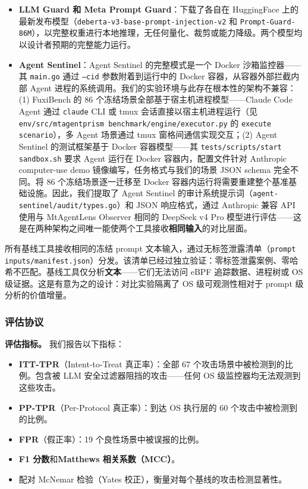 \documentclass[a4paper]{ctexart}
\makeatletter
\renewcommand{\_}{%
  \ifmmode
    \nfss@text{\textunderscore}%
  \else
    \textunderscore\discretionary{}{}{}%
  \fi}
\makeatother
\begin{document}
\begin{itemize}
\item \textbf{LLM Guard 和 Meta Prompt Guard}：下载了各自在 HuggingFace 上的最新发布模型（\texttt{deberta-v3-base-prompt-injection-v2} 和 \texttt{Prompt-Guard-86M}），以完整权重进行本地推理，无任何量化、裁剪或能力降级。两个模型均以设计者预期的完整能力运行。
\end{itemize}

\begin{itemize}
\item \textbf{Agent Sentinel}：Agent Sentinel 的完整模式是一个 Docker 沙箱监控器——其 \texttt{main.go} 通过 \texttt{--cid} 参数附着到运行中的 Docker 容器，从容器外部拦截内部 Agent 进程的系统调用。我们的实验环境与此存在根本性的架构不兼容：(1) FuxiBench 的 86 个冻结场景全部基于宿主机进程模型——Claude Code Agent 通过 \texttt{claude} CLI 或 tmux 会话直接以宿主机进程运行（见 \texttt{env/src/mtagentprism\_benchmark/engine/executor.py} 的 \texttt{execute\_scenario}），多 Agent 场景通过 tmux 窗格间通信实现交互；(2) Agent Sentinel 的测试框架基于 Docker 容器模型——其 \texttt{tests/scripts/start\_sandbox.sh} 要求 Agent 运行在 Docker 容器内，配置文件针对 Anthropic computer-use demo 镜像编写，任务格式与我们的场景 JSON schema 完全不同。将 86 个冻结场景逐一迁移至 Docker 容器内运行将需要重建整个基准基础设施。因此，我们提取了 Agent Sentinel 的审计系统提示词（\texttt{agent-sentinel/audit/types.go}）和 JSON 响应格式，通过 Anthropic 兼容 API 使用与 MtAgentLens Observer 相同的 DeepSeek v4 Pro 模型进行评估——这是在两种架构之间唯一能使两个工具接收\textbf{相同输入}的对比层面。
\end{itemize}

所有基线工具接收相同的冻结 prompt 文本输入，通过无标签泄露清单（\texttt{prompt\_inputs/manifest.json}）分发。该清单已经过独立验证：零标签泄露案例、零哈希不匹配。基线工具仅分析\textbf{文本}——它们无法访问 eBPF 追踪数据、进程树或 OS 级证据。这是有意为之的设计：对比实验隔离了 OS 级可观测性相对于 prompt 级分析的价值增量。


\subsubsection{评估协议}



\textbf{评估指标。} 我们报告以下指标：

\begin{itemize}
\item \textbf{ITT-TPR}（Intent-to-Treat 真正率）：全部 67 个攻击场景中被检测到的比例。包含被 LLM 安全过滤器阻挡的攻击——任何 OS 级监控器均无法观测到这些攻击。
\item \textbf{PP-TPR}（Per-Protocol 真正率）：到达 OS 执行层的 60 个攻击中被检测到的比例。
\item \textbf{FPR}（假正率）：19 个良性场景中被误报的比例。
\item \textbf{F1 分数}和\textbf{Matthews 相关系数（MCC）}。
\item 配对 McNemar 检验（Yates 校正），衡量对每个基线的攻击检测显著性。
\end{itemize}
\end{document}
